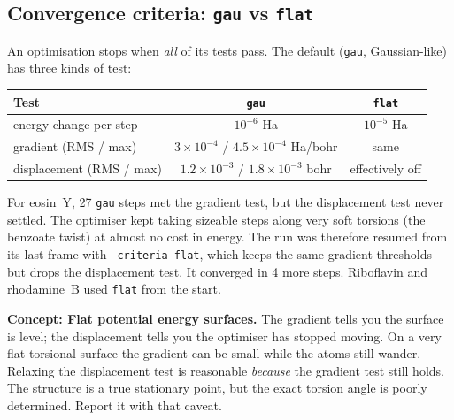 \documentclass[11pt,a4paper]{article}
\newcommand{\notehead}[2]{\par\smallskip\noindent\textbf{#1: #2.}\enspace}
\begin{document}
\subsection{Convergence criteria: \texttt{gau} vs \texttt{flat}}
An optimisation stops when \emph{all} of its tests pass. The default (\texttt{gau},
Gaussian-like) has three kinds of test:

\begin{center}\small
\begin{tabular}{@{}lcc@{}}
\toprule
Test & \texttt{gau} & \texttt{flat} \\
\midrule
energy change per step & $10^{-6}$ Ha & $10^{-5}$ Ha \\
gradient (RMS / max) & $3\times10^{-4}$ / $4.5\times10^{-4}$ Ha/bohr & same \\
displacement (RMS / max) & $1.2\times10^{-3}$ / $1.8\times10^{-3}$ bohr & effectively off \\
\bottomrule
\end{tabular}
\end{center}

For eosin~Y, 27 \texttt{gau} steps met the gradient test, but the displacement test never
settled. The optimiser kept taking sizeable steps along very soft torsions (the benzoate twist)
at almost no cost in energy. The run was therefore resumed from its last frame with
\texttt{--criteria flat}, which keeps the same gradient thresholds but drops the displacement
test. It converged in 4 more steps. Riboflavin and rhodamine~B used \texttt{flat} from the start.

\notehead{Concept}{Flat potential energy surfaces}
The gradient tells you the surface is level; the
displacement tells you the optimiser has stopped moving. On a very flat torsional surface the
gradient can be small while the atoms still wander. Relaxing the displacement test is
reasonable \emph{because} the gradient test still holds. The structure is a true stationary
point, but the exact torsion angle is poorly determined. Report it with that caveat.
\par\smallskip
\end{document}
